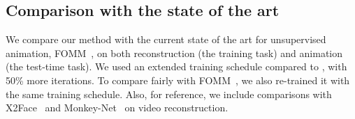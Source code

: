 \documentclass[final]{cvpr}
\begin{document}
\begin{table*}[t]
    \centering
    \vspace{-0.2cm}
    \caption{Video reconstruction: comparison with the state of the art on five different datasets. For all methods we use  regions. (Best result in bold.)}
    \label{tab:sota}
    \vspace{-0.4cm}
\end{table*}


\subsection{Comparison with the state of the art}
We compare our method with the current state of the art for unsupervised animation, FOMM~\cite{fomm}, on both reconstruction (the training task) and animation (the test-time task). We used an extended training schedule compared to \cite{fomm}, with 50\% more iterations. To compare fairly with FOMM~\cite{fomm}, we also re-trained it with the same training schedule. Also, for reference, we include comparisons with X2Face~\cite{wiles2018x2face} and Monkey-Net~\cite{siarohin2018animating} on video reconstruction.
\end{document}
